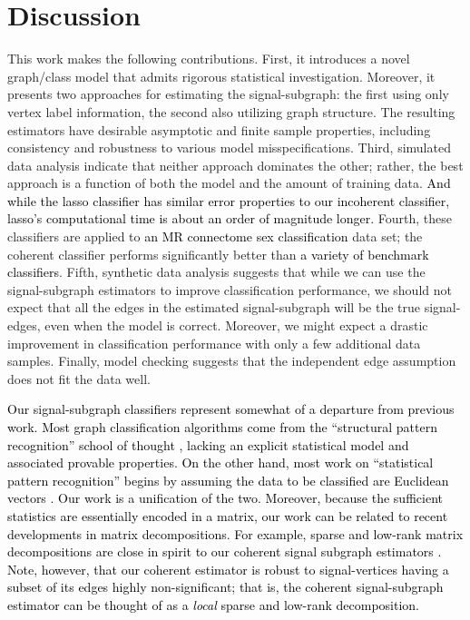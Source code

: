\documentclass[10pt,journal,cspaper,compsoc]{IEEEtran}
\providecommand{\tk}[1]{\textcolor{black}{#1}}
\newcommand{\comment}[1]{}
\begin{document}









\section{Discussion} %
\label{sec:discussion}

This work makes the following contributions. First, it introduces a novel graph/class model that admits rigorous statistical investigation.  Moreover, it presents two approaches for estimating the signal-subgraph: the first using only vertex label information, the second also utilizing graph structure.  The resulting estimators have desirable asymptotic and finite sample properties, including consistency and robustness to various model misspecifications.  Third, simulated data analysis indicate that neither approach dominates the other; rather, the best approach is a function of both the model and the amount of training data. \tk{And while the lasso classifier has similar error properties to our incoherent classifier, lasso's computational time is about an order of magnitude longer.}
Fourth, these classifiers are applied to \tk{an MR connectome sex classification} \comment{a connectome} data set; the coherent classifier performs significantly better than \comment{both na\"ive Bayes and incoherent classifiers} \tk{a variety of benchmark classifiers}.  Fifth, synthetic data analysis suggests that while we can use the signal-subgraph estimators to improve classification performance, we should not expect that all the edges in the estimated signal-subgraph will be the true signal-edges, even when the model is correct. Moreover, we might expect a drastic improvement in classification performance with only a few additional data samples.  Finally, model checking suggests that the independent edge assumption does not fit the data well.  

\tk{Our signal-subgraph classifiers represent somewhat of a departure from previous work.  Most graph classification algorithms come from the ``structural pattern recognition'' school of thought \cite{Bunke2011}, lacking an explicit statistical model and associated provable properties. On the other hand, most work on ``statistical pattern recognition'' begins by assuming the data to be classified are Euclidean vectors \cite{Devroye1997}.  Our work is a unification of the two.  Moreover, because the sufficient statistics are essentially encoded in a matrix, our work can be related to recent developments in matrix decompositions.  For example, sparse and low-rank matrix decompositions are close in spirit to our coherent signal subgraph estimators \cite{Candes2009b, Ding2011, Chandrasekaran2011}. Note, however, that our coherent estimator is robust to signal-vertices having a subset of its edges highly non-significant; that is, the coherent signal-subgraph estimator can be thought of as a \emph{local} sparse and low-rank decomposition.}
\end{document}

